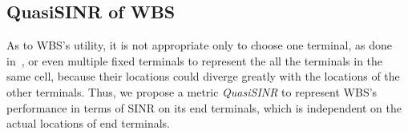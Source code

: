 \documentclass[times]{ettauth}
\newcommand{\ie}{i.e., }
\theoremstyle{mytheoremstyle}
\theoremstyle{mytheoremstyle}
\theoremstyle{mytheoremstyle}
\begin{document}
\subsection{QuasiSINR of WBS}
As to WBS's utility, it is not appropriate only to choose one terminal, as done in~\cite{spectrum_sharing_tvspace_2012}, or even multiple fixed terminals to represent the all the terminals in the same cell, because their locations could diverge greatly with the locations of the other terminals.
Thus, we propose a metric \textit{QuasiSINR} to represent WBS's performance in terms of SINR on its end terminals, which is independent on the actual locations of end terminals.


\end{document}
